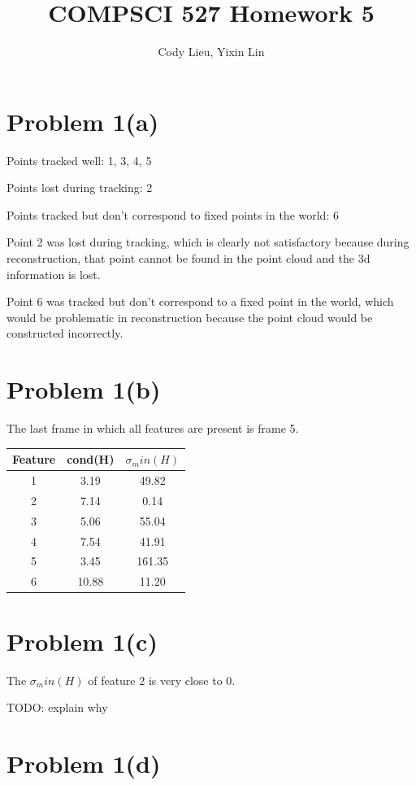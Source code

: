 \documentclass{article}
\author{Cody Lieu, Yixin Lin}
\title{COMPSCI 527 Homework 5}
\begin{document}
\maketitle

\section*{Problem 1(a)}

Points tracked well: 1, 3, 4, 5

Points lost during tracking: 2

Points tracked but don't correspond to fixed points in the world: 6

Point 2 was lost during tracking, which is clearly not satisfactory because during reconstruction, that point cannot be found in the point cloud and the 3d information is lost.

Point 6 was tracked but don't correspond to a fixed point in the world, which would be problematic in reconstruction because the point cloud would be constructed incorrectly.

\section*{Problem 1(b)}

The last frame in which all features are present is frame 5.

\begin{center}
\begin{tabular}{ ||c|c|c|| } 
	\hline
	Feature & cond(H) & $\sigma_min(H)$ \\ \hline
 	1 &3.19 &49.82 \\ 
	2 &7.14 &0.14 \\
	3 &5.06 &55.04 \\
	4 &7.54 &41.91 \\
	5 &3.45 &161.35 \\
	6 &10.88 &11.20 \\
\hline
\end{tabular}
\end{center}

\section*{Problem 1(c)}
The $\sigma_min(H)$ of feature 2 is very close to 0.

TODO: explain why

\section*{Problem 1(d)}
\end{document}
